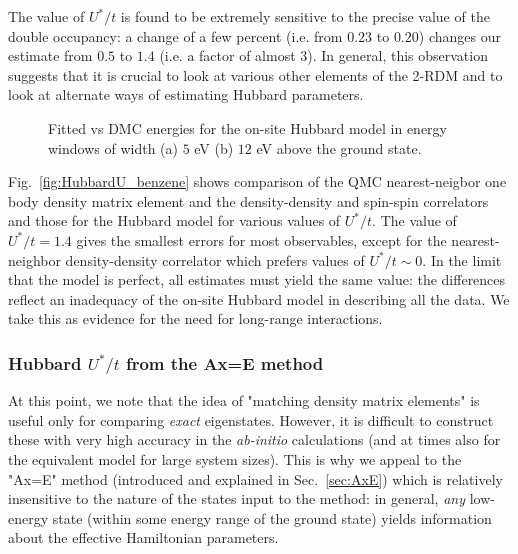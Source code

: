 \documentclass[aip,jcp,twocolumn,10pt]{revtex4-1}
\begin{document}
The value of $U^{*}/t$ is found to be extremely sensitive to the precise value of 
the double occupancy: a change of a few percent (i.e. from $0.23$ to $0.20$) 
changes our estimate from $0.5$ to $1.4$ (i.e. a factor of almost $3$). In general, 
this observation suggests that it is crucial to look at various other 
elements of the 2-RDM and to look at alternate ways 
of estimating Hubbard parameters.

\begin{figure}[htpb]
\centering
{}
\caption{Fitted vs DMC energies for the on-site 
Hubbard model in energy windows of width 
(a) $5$ eV (b) $12$ eV above the ground state.}
\label{fig:Ax_b_Hubbard}
\end{figure}	

Fig.~\ref{fig:HubbardU_benzene} shows comparison of the QMC 
nearest-neigbor one body density matrix element 
and the density-density and spin-spin correlators and those for the Hubbard model 
for various values of $U^{*}/t$. The value of $U^{*}/t = 1.4$ gives the smallest errors 
for most observables, except for the nearest-neighbor
density-density correlator which prefers values of $U^{*}/t \sim 0$. 
In the limit that the model is perfect, all estimates must 
yield the same value: the differences reflect an inadequacy 
of the on-site Hubbard model in describing all the data. 
We take this as evidence for the need for long-range interactions.

\subsubsection{Hubbard $U^{*}/t$ from the Ax=E method}
At this point, we note that the idea of "matching density matrix elements"
is useful only for comparing \emph{exact} eigenstates. However, it is 
difficult to construct these with very high accuracy in the \emph{ab-initio}
calculations (and at times also for the equivalent model for large system sizes). 
This is why we appeal to the "Ax=E" method (introduced 
and explained in Sec.~\ref{sec:AxE}) 
which is relatively insensitive to the nature of the states input 
to the method: in general, \emph{any} low-energy state 
(within some energy range of the ground state) 
yields information about the effective Hamiltonian 
parameters.
\end{document}
